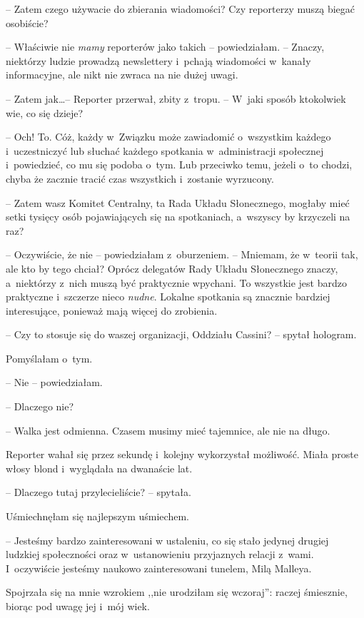 \documentclass[oneside,polish,11pt,sfheadings]{mwbk}
\begin{document}
-- Zatem czego używacie do zbierania wiadomości? Czy reporterzy muszą
biegać osobiście?

-- Właściwie nie \textit{mamy} reporterów jako takich -- powiedziałam. -- Znaczy, niektórzy ludzie prowadzą newslettery i~pchają wiadomości w~kanały informacyjne, ale nikt nie zwraca na nie dużej uwagi.

-- Zatem jak\ldots  -- Reporter przerwał, zbity z~tropu. -- W~jaki sposób
ktokolwiek wie, co się dzieje?

-- Och! To. Cóż, każdy w~Związku może zawiadomić o~wszystkim każdego i~uczestniczyć lub słuchać każdego spotkania w~administracji społecznej i~powiedzieć, co mu się podoba o~tym. Lub przeciwko temu, jeżeli o~to
chodzi, chyba że zacznie tracić czas wszystkich i~zostanie wyrzucony.

-- Zatem wasz Komitet Centralny, ta Rada Układu Słonecznego, mogłaby mieć
setki tysięcy osób pojawiających się na spotkaniach, a~wszyscy by
krzyczeli na raz?

-- Oczywiście, że nie -- powiedziałam z~oburzeniem. -- Mniemam, że w~teorii
tak, ale kto by tego chciał? Oprócz delegatów Rady Układu Słonecznego
znaczy, a~niektórzy z~nich muszą być praktycznie wpychani. To wszystkie
jest bardzo praktyczne i~szczerze nieco \textit{nudne}. Lokalne spotkania
są znacznie bardziej interesujące, ponieważ mają więcej do zrobienia.

-- Czy to stosuje się do waszej organizacji, Oddziału Cassini? -- spytał
hologram.

Pomyślałam o~tym. 

-- Nie -- powiedziałam.

-- Dlaczego nie?

-- Walka jest odmienna. Czasem musimy mieć tajemnice, ale nie na długo.

Reporter wahał się przez sekundę i~kolejny wykorzystał możliwość. Miała
proste włosy blond i~wyglądała na dwanaście lat. 

-- Dlaczego tutaj
przylecieliście? -- spytała.

Uśmiechnęłam się najlepszym uśmiechem. 

-- Jesteśmy bardzo zainteresowani
w ustaleniu, co się stało jedynej drugiej ludzkiej społeczności oraz w~ustanowieniu przyjaznych relacji z~wami. I~oczywiście jesteśmy naukowo
zainteresowani tunelem, Milą Malleya.

Spojrzała się na mnie wzrokiem ,,nie urodziłam się wczoraj'': raczej śmiesznie,
biorąc pod uwagę jej i~mój wiek. 
\end{document}
